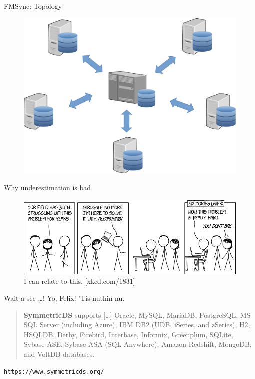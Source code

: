 \documentclass[xcolor=x11names, aspectratio=169,usenames,dvipsnames]{beamer}
\begin{document}
\begin{frame}{FMSync: Topology}
\begin{figure}
	\includegraphics[height=.8\textheight]{img/topo.pdf}
\end{figure}
\end{frame}

\begin{frame}{Why underestimation is bad}
\begin{center}
	\begin{figure}
		\includegraphics[width=\textwidth]{img/xkcd.png}
		\caption{I can relate to this. [xkcd.com/1831]}
	\end{figure}
\end{center}
\end{frame}

\begin{frame}{Wait a sec \dots!}\large
Yo, Felix! 'Tis nuthin nu.\pause\bigskip
\normalsize

\begin{quote}
	\textbf{SymmetricDS} supports [\dots] \alert{Oracle}, \alert{MySQL}, MariaDB, \alert{PostgreSQL}, MS SQL Server (including Azure), IBM DB2 (UDB, iSeries, and zSeries), H2, HSQLDB, Derby, Firebird, Interbase, Informix, Greenplum, \alert{SQLite}, Sybase ASE, Sybase ASA (SQL Anywhere), Amazon Redshift, \alert{MongoDB}, and VoltDB databases.
\end{quote}\vspace{-1em}
\begin{flushright}
	\texttt{https://www.symmetricds.org/}
\end{flushright}
\end{frame}
\end{document}
